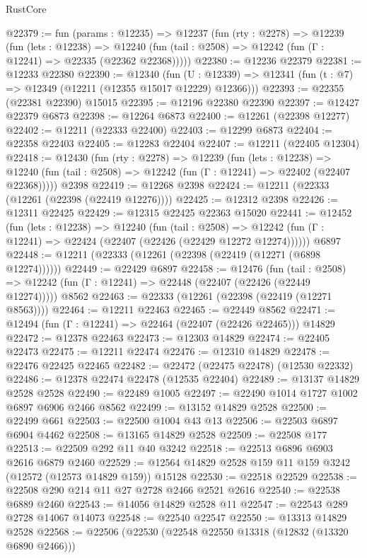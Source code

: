 \begin{lexlean}{RustCore}
\begin{coremodule}
@22379 := fun (params : @12235) =>
  @12237
    (fun (rty : @2278) =>
    @12239
      (fun (lets : @12238) =>
      @12240 (fun (tail : @2508) => @12242 (fun (Γ : @12241) => @22335 (@22362 @22368)))))
@22380 := @12236 @22379
@22381 := @12233 @22380
@22390 := @12340
    (fun (U : @12339) => @12341 (fun (t : @7) => @12349 (@12211 (@12355 @15017 @12229) @12366)))
@22393 := @22355 (@22381 @22390) @15015
@22395 := @12196 @22380 @22390
@22397 := @12427 @22379 @6873
@22398 := @12264 @6873
@22400 := @12261 (@22398 @12277)
@22402 := @12211 (@22333 @22400)
@22403 := @12299 @6873
@22404 := @22358 @22403
@22405 := @12283 @22404
@22407 := @12211 (@22405 @12304)
@22418 := @12430
    (fun (rty : @2278) =>
    @12239
      (fun (lets : @12238) =>
      @12240 (fun (tail : @2508) => @12242 (fun (Γ : @12241) => @22402 (@22407 @22368)))))
    @2398
@22419 := @12268 @2398
@22424 := @12211 (@22333 (@12261 (@22398 (@22419 @12276))))
@22425 := @12312 @2398
@22426 := @12311 @22425
@22429 := @12315 @22425 @22363 @15020
@22441 := @12452
    (fun (lets : @12238) =>
    @12240
      (fun (tail : @2508) =>
      @12242 (fun (Γ : @12241) => @22424 (@22407 (@22426 (@22429 @12272 @12274))))))
    @6897
@22448 := @12211 (@22333 (@12261 (@22398 (@22419 (@12271 (@6898 @12274))))))
@22449 := @22429 @6897
@22458 := @12476
    (fun (tail : @2508) => @12242 (fun (Γ : @12241) => @22448 (@22407 (@22426 (@22449 @12274)))))
    @8562
@22463 := @22333 (@12261 (@22398 (@22419 (@12271 @8563))))
@22464 := @12211 @22463
@22465 := @22449 @8562
@22471 := @12494 (fun (Γ : @12241) => @22464 (@22407 (@22426 @22465))) @14829
@22472 := @12378 @22463
@22473 := @12303 @14829
@22474 := @22405 @22473
@22475 := @12211 @22474
@22476 := @12310 @14829
@22478 := @22476 @22425 @22465
@22482 := @22472 (@22475 @22478) (@12530 @22332)
@22486 := @12378 @22474 @22478 (@12535 @22404)
@22489 := @13137 @14829 @2528 @2528
@22490 := @22489 @1005
@22497 := @22490 @1014 @1727 @1002 @6897 @6906 @2466 @8562
@22499 := @13152 @14829 @2528
@22500 := @22499 @661
@22503 := @22500 @1004 @43 @13
@22506 := @22503 @6897 @6904 @4462
@22508 := @13165 @14829 @2528
@22509 := @22508 @177
@22513 := @22509 @292 @11 @40 @3242
@22518 := @22513 @6896 @6903 @2616 @6879 @2460
@22529 := @12564 @14829 @2528 @159 @11 @159 @3242 (@12572 (@12573 @14829 @159)) @15128
@22530 := @22518 @22529
@22538 := @22508 @290 @214 @11 @27 @2728 @2466 @2521 @2616
@22540 := @22538 @6889 @2460
@22543 := @14056 @14829 @2528 @11
@22547 := @22543 @289 @2728 @14067 @14073
@22548 := @22540 @22547
@22550 := @13313 @14829 @2528
@22568 := @22506
    (@22530
      (@22548 @22550 @13318 (@12832 (@13320 @6890 @2466)))

\end{coremodule}
\end{lexlean}
